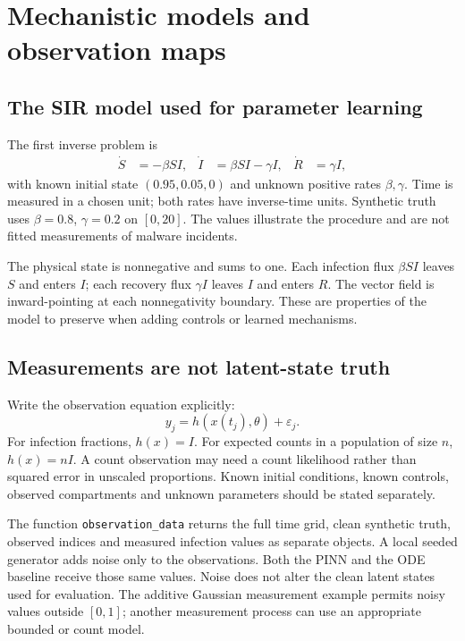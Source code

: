\documentclass[11pt,a4paper]{article}
\theoremstyle{definition}
\theoremstyle{remark}
\begin{document}
\section{Mechanistic models and observation maps}
\subsection{The SIR model used for parameter learning}
The first inverse problem is
\begin{align}
\dot S&=-\beta SI, & \dot I&=\beta SI-\gamma I, & \dot R&=\gamma I,
\label{eq:inverse-sir}
\end{align}
with known initial state $(0.95,0.05,0)$ and unknown positive rates $\beta,\gamma$. Time is measured in a chosen unit; both rates have inverse-time units. Synthetic truth uses $\beta=0.8$, $\gamma=0.2$ on $[0,20]$. The values illustrate the procedure and are not fitted measurements of malware incidents.

The physical state is nonnegative and sums to one. Each infection flux $\beta SI$ leaves $S$ and enters $I$; each recovery flux $\gamma I$ leaves $I$ and enters $R$. The vector field is inward-pointing at each nonnegativity boundary. These are properties of the model to preserve when adding controls or learned mechanisms.

\subsection{Measurements are not latent-state truth}
Write the observation equation explicitly:
\begin{equation}
y_j=h(x(t_j),\theta)+\varepsilon_j.
\label{eq:observation}
\end{equation}
For infection fractions, $h(x)=I$. For expected counts in a population of size $n$, $h(x)=nI$. A count observation may need a count likelihood rather than squared error in unscaled proportions. Known initial conditions, known controls, observed compartments and unknown parameters should be stated separately.

The function \texttt{observation\_data} returns the full time grid, clean synthetic truth, observed indices and measured infection values as separate objects. A local seeded generator adds noise only to the observations. Both the PINN and the ODE baseline receive those same values. Noise does not alter the clean latent states used for evaluation. The additive Gaussian measurement example permits noisy values outside $[0,1]$; another measurement process can use an appropriate bounded or count model.
\end{document}
